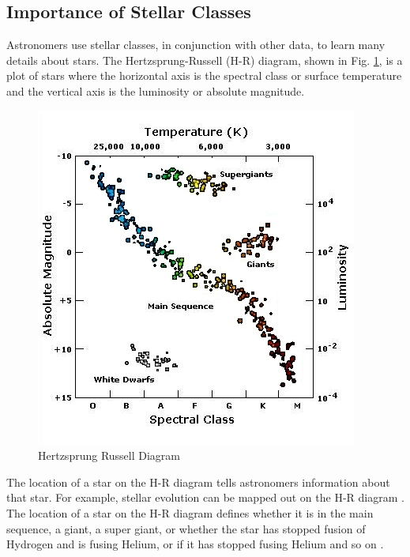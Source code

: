 \documentclass[conference]{IEEEtran}
\begin{document}
	\subsection{Importance of Stellar Classes}\label{sec:importance}

        	Astronomers use stellar classes, in conjunction with other data, to learn many details about stars. The Hertzsprung-Russell (H-R) diagram, shown in Fig. \ref{fig:HR}, is a plot of stars where the horizontal axis is the spectral class or surface temperature and the vertical axis is the luminosity or absolute magnitude.
  
        \begin{figure}
            \centering
            \includegraphics[scale = .37]{HR.jpg} %
            \caption{Hertzsprung Russell Diagram \cite{hr}}
            \label{fig:HR}
        \end{figure}

        The location of a star on the H-R diagram tells astronomers information about that star. For example, stellar evolution can be mapped out on the H-R diagram \cite{Carroll}. The location of a star on the H-R diagram defines whether it is in the main sequence, a giant, a super giant, or whether the star has stopped fusion of Hydrogen and is fusing Helium, or if it has stopped fusing Helium and so on \cite{Carroll}.
\end{document}
